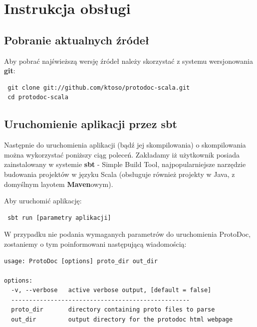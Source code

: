 \documentclass[a4paper]{article}
\begin{document}
\newpage
\section{Instrukcja obsługi}
\subsection{Pobranie aktualnych źródeł}
Aby pobrać najświeższą wersję źródeł należy skorzystać z systemu wersjonowania \textbf{git}:
\begin{verbatim}
 git clone git://github.com/ktoso/protodoc-scala.git
 cd protodoc-scala
\end{verbatim}

\subsection{Uruchomienie aplikacji przez sbt}
Następnie do uruchomienia aplikacji (bądź jej skompilowania) o skompilowania można wykorzystać poniższy ciąg poleceń.
Zakładamy iż użytkownik posiada zainstalowany w systemie \textbf{sbt} - Simple Build Tool, najpopularniejsze narzędzie budowania 
projektów w języku Scala (obsługuje również projekty w Java, z domyślnym layotem \textbf{Maven}owym).

Aby uruchomić aplikację:
\begin{verbatim}
 sbt run [parametry aplikacji]
\end{verbatim}

W przypadku nie podania wymaganych parametrów do uruchomienia ProtoDoc, zostaniemy o tym poinformowani następującą wiadomością:
\begin{verbatim}
usage: ProtoDoc [options] proto_dir out_dir

options:
  -v, --verbose   active verbose output, [default = false]
  --------------------------------------------------
  proto_dir       directory containing proto files to parse
  out_dir         output directory for the protodoc html webpage
\end{verbatim}
\end{document}
